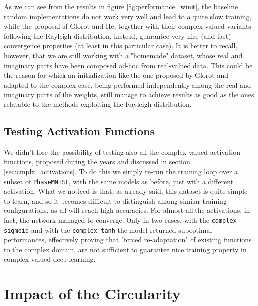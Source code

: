 \documentclass[../main.tex]{subfiles}
\begin{document}
As we can see from the results in figure \ref{fig:performance_winit}, the baseline random implementations do not work very well and lead to a quite slow training, while the proposal of Glorot and He, together with their complex-valued variants following the Rayleigh distribution, instead, guarantee very nice (and fast) convergence properties (at least in this particular case). It is better to recall, however, that we are still working with a "homemade" dataset, whose real and imaginary parts have been composed ad-hoc from real-valued data. This could be the reason for which an initialization like the one proposed by Glorot and adapted to the complex case, being performed independently among the real and imaginary parts of the weights, still manage to achieve results as good as the ones relatable to the methods exploiting the Rayleigh distribution.


\subsection*{Testing Activation Functions}

We didn't lose the possibility of testing also all the complex-valued activation functions, proposed during the years and discussed in section \ref{sec:cmplx_activations}. To do this we simply re-run the training loop over a subset of \texttt{PhaseMNIST}, with the same models as before, just with a different activation. What we noticed is that, as already said, this dataset is quite simple to learn, and so it becomes difficult to distinguish among similar training configurations, as all will reach high accuracies. For almost all the activations, in fact, the network managed to converge. Only in two cases, with the \texttt{complex sigmoid} and with the \texttt{complex tanh} the model returned suboptimal performances, effectively proving that "forced re-adaptation" of existing functions to the complex domain, are not sufficient to guarantee nice training property in complex-valued deep learning.


\section{Impact of the Circularity}
\end{document}
